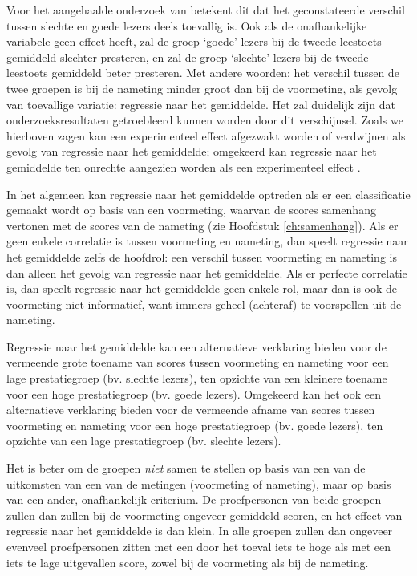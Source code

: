 \documentclass[
]{book}
\begin{document}
Voor het aangehaalde onderzoek van betekent dit dat het geconstateerde
verschil tussen slechte en goede lezers deels toevallig is. Ook als de
onafhankelijke variabele geen effect heeft, zal de groep `goede' lezers
bij de tweede leestoets gemiddeld slechter presteren, en zal de groep
`slechte' lezers bij de tweede leestoets gemiddeld beter presteren. Met
andere woorden: het verschil tussen de twee groepen is bij de nameting
minder groot dan bij de voormeting, als gevolg van toevallige variatie:
regressie naar het gemiddelde. Het zal duidelijk zijn dat
onderzoeksresultaten getroebleerd kunnen worden door dit verschijnsel.
Zoals we hierboven zagen kan een experimenteel effect afgezwakt worden
of verdwijnen als gevolg van regressie naar het gemiddelde; omgekeerd
kan regressie naar het gemiddelde ten onrechte aangezien worden als een
experimenteel effect \citep{RMP18}.

In het algemeen kan regressie naar het gemiddelde optreden als er een
classificatie gemaakt wordt op basis van een voormeting, waarvan de
scores samenhang vertonen met de scores van de nameting (zie
Hoofdstuk \ref{ch:samenhang}). Als er geen enkele correlatie is tussen
voormeting en nameting, dan speelt regressie naar het gemiddelde zelfs
de hoofdrol: een verschil tussen voormeting en nameting is dan alleen
het gevolg van regressie naar het gemiddelde. Als er perfecte correlatie
is, dan speelt regressie naar het gemiddelde geen enkele rol, maar dan
is ook de voormeting niet informatief, want immers geheel (achteraf) te
voorspellen uit de nameting.

Regressie naar het gemiddelde kan een alternatieve verklaring bieden
voor de vermeende grote toename van scores tussen voormeting en nameting
voor een lage prestatiegroep (bv. slechte lezers), ten opzichte van een
kleinere toename voor een hoge prestatiegroep (bv. goede lezers).
Omgekeerd kan het ook een alternatieve verklaring bieden voor de
vermeende afname van scores tussen voormeting en nameting voor een hoge
prestatiegroep (bv. goede lezers), ten opzichte van een lage
prestatiegroep (bv. slechte lezers).

Het is beter om de groepen \emph{niet} samen te stellen op basis van een van
de uitkomsten van een van de metingen (voormeting of nameting), maar op
basis van een ander, onafhankelijk criterium. De proefpersonen van beide
groepen zullen dan zullen bij de voormeting ongeveer gemiddeld scoren,
en het effect van regressie naar het gemiddelde is dan klein. In alle
groepen zullen dan ongeveer evenveel proefpersonen zitten met een door
het toeval iets te hoge als met een iets te lage uitgevallen score,
zowel bij de voormeting als bij de nameting.
\end{document}
